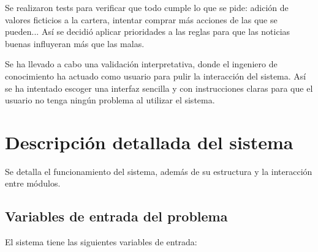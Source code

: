 \documentclass[a4paper, 11pt, titlepage]{article}
\theoremstyle{definition}
\begin{document}
  Se realizaron tests para verificar que todo cumple lo que se pide: adición de
  valores ficticios a la cartera, intentar comprar más acciones de las que se
  pueden... Así se decidió aplicar prioridades a las reglas para que las noticias
  buenas influyeran más que las malas.

  Se ha llevado a cabo una validación interpretativa, donde el ingeniero de
  conocimiento ha actuado como usuario para pulir la interacción del sistema.
  Así se ha intentado escoger una interfaz sencilla y con instrucciones claras
  para que el usuario no tenga ningún problema al utilizar el sistema.


  \section{Descripción detallada del sistema}
  Se detalla el funcionamiento del sistema, además de su estructura y la
  interacción entre módulos.

  \subsection{Variables de entrada del problema}
  El sistema tiene las siguientes variables de entrada:
\end{document}
